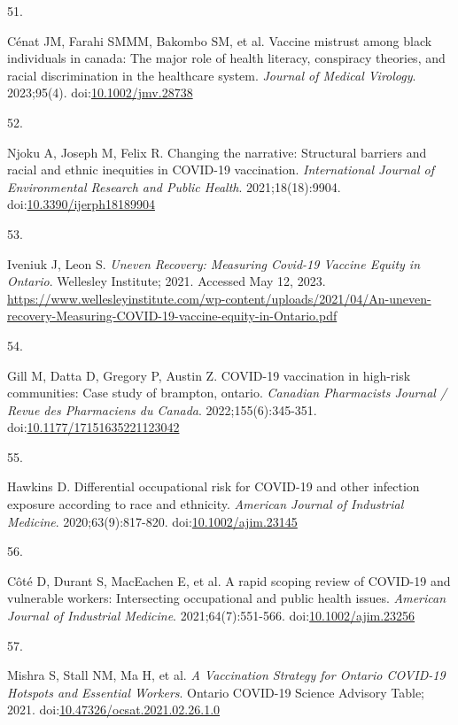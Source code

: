 \documentclass[
  letterpaper,
  DIV=11,
  numbers=noendperiod]{scrartcl}
\newlength{\cslhangindent}
\newlength{\csllabelwidth}
\newlength{\cslentryspacingunit} %
\newenvironment{CSLReferences}[2] %
 {%
  \setlength{\parindent}{0pt}
  \ifodd #1
  \let\oldpar\par
  \def\par{\hangindent=\cslhangindent\oldpar}
  \fi
  \setlength{\parskip}{#2\cslentryspacingunit}
 }%
 {}
\newcommand{\CSLLeftMargin}[1]{\parbox[t]{\csllabelwidth}{#1}}
\newcommand{\CSLRightInline}[1]{\parbox[t]{\linewidth - \csllabelwidth}{#1}\break}
\begin{document}
\begin{CSLReferences}{0}{0}
\leavevmode{}%
\CSLLeftMargin{51. }%
\CSLRightInline{Cénat JM, Farahi SMMM, Bakombo SM, et al. Vaccine
mistrust among black individuals in canada: The major role of health
literacy, conspiracy theories, and racial discrimination in the
healthcare system. \emph{Journal of Medical Virology}. 2023;95(4).
doi:\href{https://doi.org/10.1002/jmv.28738}{10.1002/jmv.28738}}

\leavevmode{}%
\CSLLeftMargin{52. }%
\CSLRightInline{Njoku A, Joseph M, Felix R. Changing the narrative:
Structural barriers and racial and ethnic inequities in {COVID}-19
vaccination. \emph{International Journal of Environmental Research and
Public Health}. 2021;18(18):9904.
doi:\href{https://doi.org/10.3390/ijerph18189904}{10.3390/ijerph18189904}}

\leavevmode{}%
\CSLLeftMargin{53. }%
\CSLRightInline{Iveniuk J, Leon S. \emph{Uneven Recovery: Measuring
Covid-19 Vaccine Equity in Ontario}. Wellesley Institute; 2021. Accessed
May 12, 2023.
\url{https://www.wellesleyinstitute.com/wp-content/uploads/2021/04/An-uneven-recovery-Measuring-COVID-19-vaccine-equity-in-Ontario.pdf}}

\leavevmode{}%
\CSLLeftMargin{54. }%
\CSLRightInline{Gill M, Datta D, Gregory P, Austin Z. {COVID}-19
vaccination in high-risk communities: Case study of brampton, ontario.
\emph{Canadian Pharmacists Journal / Revue des Pharmaciens du Canada}.
2022;155(6):345-351.
doi:\href{https://doi.org/10.1177/17151635221123042}{10.1177/17151635221123042}}

\leavevmode{}%
\CSLLeftMargin{55. }%
\CSLRightInline{Hawkins D. Differential occupational risk for {COVID}-19
and other infection exposure according to race and ethnicity.
\emph{American Journal of Industrial Medicine}. 2020;63(9):817-820.
doi:\href{https://doi.org/10.1002/ajim.23145}{10.1002/ajim.23145}}

\leavevmode{}%
\CSLLeftMargin{56. }%
\CSLRightInline{Côté D, Durant S, MacEachen E, et al. A rapid scoping
review of {COVID}-19 and vulnerable workers: Intersecting occupational
and public health issues. \emph{American Journal of Industrial
Medicine}. 2021;64(7):551-566.
doi:\href{https://doi.org/10.1002/ajim.23256}{10.1002/ajim.23256}}

\leavevmode{}%
\CSLLeftMargin{57. }%
\CSLRightInline{Mishra S, Stall NM, Ma H, et al. \emph{A Vaccination
Strategy for Ontario {COVID}-19 Hotspots and Essential Workers}. Ontario
{COVID}-19 Science Advisory Table; 2021.
doi:\href{https://doi.org/10.47326/ocsat.2021.02.26.1.0}{10.47326/ocsat.2021.02.26.1.0}}


\end{CSLReferences}
\end{document}
